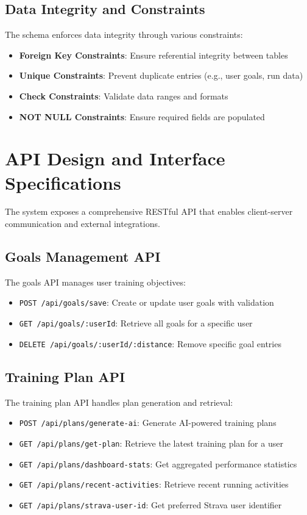 \subsection{Data Integrity and Constraints}

The schema enforces data integrity through various constraints:

\begin{itemize}
    \item \textbf{Foreign Key Constraints}: Ensure referential integrity between tables
    \item \textbf{Unique Constraints}: Prevent duplicate entries (e.g., user goals, run data)
    \item \textbf{Check Constraints}: Validate data ranges and formats
    \item \textbf{NOT NULL Constraints}: Ensure required fields are populated
\end{itemize}

\section{API Design and Interface Specifications}

The system exposes a comprehensive RESTful API that enables client-server communication and external integrations.

\subsection{Goals Management API}

The goals API manages user training objectives:

\begin{itemize}
    \item \texttt{POST /api/goals/save}: Create or update user goals with validation
    \item \texttt{GET /api/goals/:userId}: Retrieve all goals for a specific user
    \item \texttt{DELETE /api/goals/:userId/:distance}: Remove specific goal entries
\end{itemize}

\subsection{Training Plan API}

The training plan API handles plan generation and retrieval:

\begin{itemize}
    \item \texttt{POST /api/plans/generate-ai}: Generate AI-powered training plans
    \item \texttt{GET /api/plans/get-plan}: Retrieve the latest training plan for a user
    \item \texttt{GET /api/plans/dashboard-stats}: Get aggregated performance statistics
    \item \texttt{GET /api/plans/recent-activities}: Retrieve recent running activities
    \item \texttt{GET /api/plans/strava-user-id}: Get preferred Strava user identifier
\end{itemize}

